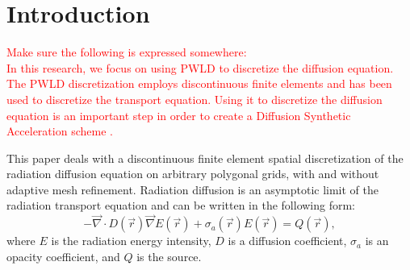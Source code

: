 \documentclass[preprint,10pt]{elsarticle}
\renewcommand{\div}{\vec{\nabla}\! \cdot \!}
\newcommand{\grad}{\vec{\nabla}}
\newcommand{\vr}{\vec{r}}
\newcommand{\tcr}[1]{\textcolor{red}{#1}}
\begin{document}
\linenumbers

\section{Introduction} \label{sec:intro}

\tcr{Make sure the following is expressed somewhere:\\
In this
research, we focus on using PWLD to discretize the diffusion equation. The
PWLD discretization employs discontinuous finite elements and has been used to
discretize the transport equation. Using it to discretize the diffusion
equation is an important step in order to create a Diffusion Synthetic
Acceleration scheme \cite{Adams2002,Wang2010}.
}
\bigskip

This paper deals with a discontinuous finite element spatial discretization of the radiation 
diffusion equation on arbitrary polygonal grids, with and without adaptive mesh refinement. 
Radiation diffusion is an asymptotic limit of the radiation transport equation and can be 
written in the following form:
\begin{equation} \label{eq:radiation_diffusion}
- \div  D(\vr) \grad E(\vr) + \sigma_a(\vr) E(\vr) = Q(\vr) ,
\end{equation}
where $E$ is the radiation energy intensity, $D$ is a diffusion coefficient, $\sigma_a$ is 
an opacity coefficient, and $Q$ is the source.
\end{document}
